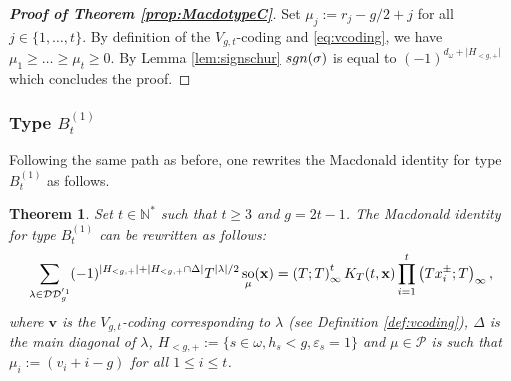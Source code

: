 \documentclass[11pt,letterpaper]{amsart}
\def\ccdd{\mathcal {DD}}
\def\ccp{\mathcal P}
\def\sgn{{\rm sgn}}
\newtheorem{thm}[df]{Theorem}
\DeclareMathOperator{\oo}{so}
\numberwithin{equation}{section}
\numberwithin{df}{section}
\begin{document}
\begin{proof}[\textbf{Proof of Theorem \ref{prop:MacdotypeC}}]
Set $\mu_j:=r_j-g/2+j$ for all $j\in\lbrace 1,\dots,t\rbrace$. By definition of the $V_{g,t}$-coding and \eqref{eq:vcoding}, we have $\mu_1\geq \dots\geq \mu_t\geq 0$. By Lemma \ref{lem:signschur} $\sgn(\sigma)$ is equal to $(-1)^{d_{\omega}+\lvert H_{<g,+}\rvert}$ which concludes the proof.
\end{proof}


\subsubsection{Type $B^{(1)}_{t}$}

Following the same path as before, one rewrites the Macdonald identity for type $B^{(1)}_{t}$ as follows.
\begin{thm}\label{prop:Macdotypeb}
Set $t\in\mathbb{N}^*$ such that $t\geq 3$ and $g=2t-1$. The Macdonald identity for type $B^{(1)}_{t}$ can be rewritten as follows:
\begin{equation}\label{eq:macdob}
\sum_{\lambda\in\ccdd_{g}^{'1}} (-1)^{\lvert H_{<g,+}\rvert+\lvert H_{<g,+}\cap \Delta\rvert}T^{\lvert\lambda\rvert/2}\oo_{\mu}({\bf x})=\left(T;T\right)_\infty^{t} K_T(t,\mathbf{x})\prod_{i=1}^t \left(Tx_i^{\pm};T\right)_\infty,
\end{equation}
where $\mathbf{v}$ is the $V_{g,t}$-coding corresponding to $\lambda$ (see Definition \ref{def:vcoding}), $\Delta$ is the main diagonal of $\lambda$, $H_{<g,+}:=\lbrace s\in\omega, h_s<g, \varepsilon_s=1\rbrace$ and $\mu\in\ccp$ is such that
$\mu_i:=\left(v_i+i-g\right)$ for all $1\leq i \leq t$.
\end{thm}
\end{document}
